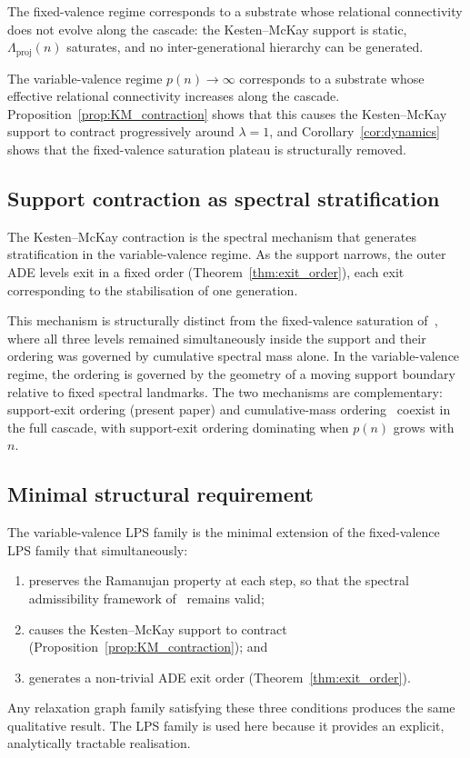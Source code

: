 \documentclass[11pt]{article}
\newcommand{\Lproj}{\Lambda_{\mathrm{proj}}}
\begin{document}
    The fixed-valence regime corresponds to a substrate whose relational
    connectivity does not evolve along the cascade: the Kesten--McKay support is
    static, $\Lproj(n)$ saturates, and no inter-generational hierarchy can be
    generated.

    The variable-valence regime $p(n) \to \infty$ corresponds to a substrate
    whose effective relational connectivity increases along the cascade.
    Proposition~\ref{prop:KM_contraction} shows that this causes the Kesten--McKay
    support to contract progressively around $\lambda = 1$, and
    Corollary~\ref{cor:dynamics} shows that the fixed-valence saturation plateau
    is structurally removed.

  \subsection{Support contraction as spectral stratification}
    \label{subsec:stratification}

    The Kesten--McKay contraction is the spectral mechanism that generates
    stratification in the variable-valence regime.
    As the support narrows, the outer ADE levels exit in a fixed order
    (Theorem~\ref{thm:exit_order}), each exit corresponding to the stabilisation
    of one generation.

    This mechanism is structurally distinct from the fixed-valence saturation
    of~\cite{Beau2026a5}, where all three levels remained simultaneously inside
    the support and their ordering was governed by cumulative spectral mass alone.
    In the variable-valence regime, the ordering is governed by the geometry of
    a moving support boundary relative to fixed spectral landmarks.
    The two mechanisms are complementary: support-exit ordering (present paper)
    and cumulative-mass ordering~\cite{Beau2026a5} coexist in the full cascade,
    with support-exit ordering dominating when $p(n)$ grows with $n$.

  \subsection{Minimal structural requirement}
    \label{subsec:minimal}

    The variable-valence LPS family is the minimal extension of the fixed-valence
    LPS family that simultaneously:
    \begin{enumerate}
      \item preserves the Ramanujan property at each step, so that the spectral
      admissibility framework of~\cite{Beau2026a1} remains valid;
      \item causes the Kesten--McKay support to contract
      (Proposition~\ref{prop:KM_contraction}); and
      \item generates a non-trivial ADE exit order
      (Theorem~\ref{thm:exit_order}).
    \end{enumerate}
    Any relaxation graph family satisfying these three conditions produces the
    same qualitative result.
    The LPS family is used here because it provides an explicit, analytically
    tractable realisation.
\end{document}

